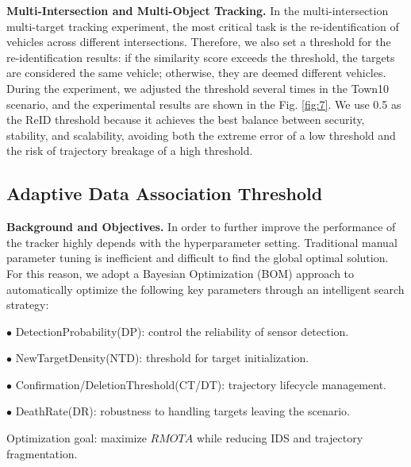 \documentclass[journal,twoside,web]{ieeecolor}
\begin{document}
\textbf{Multi-Intersection and Multi-Object Tracking.}
In the multi-intersection multi-target tracking experiment, the most critical task is the re-identification of vehicles across different intersections. 
Therefore, we also set a threshold for the re-identification results: if the similarity score exceeds the threshold, the targets are considered the same vehicle; otherwise, they are deemed different vehicles. 
During the experiment, we adjusted the threshold several times in the Town10 scenario, and the experimental results are shown in the Fig. \ref{fig:7}.
We use 0.5 as the ReID threshold because it achieves the best balance between security, stability, and scalability, avoiding both the extreme error of a low threshold and the risk of trajectory breakage of a high threshold.

\subsection{Adaptive Data Association Threshold}

\textbf{Background and Objectives.}
In order to further improve the performance of the tracker highly depends with the hyperparameter setting. 
Traditional manual parameter tuning is inefficient and difficult to find the global optimal solution. 
For this reason, we adopt a Bayesian Optimization (BOM) approach to automatically optimize the following key parameters through an intelligent search strategy:

\(\bullet\) DetectionProbability(DP): control the reliability of sensor detection.

\(\bullet\) NewTargetDensity(NTD): threshold for target initialization.

\(\bullet\) Confirmation/DeletionThreshold(CT/DT): trajectory lifecycle management.

\(\bullet\) DeathRate(DR): robustness to handling targets leaving the scenario.

Optimization goal: maximize \(RMOTA\) while reducing IDS and trajectory fragmentation.
\end{document}
